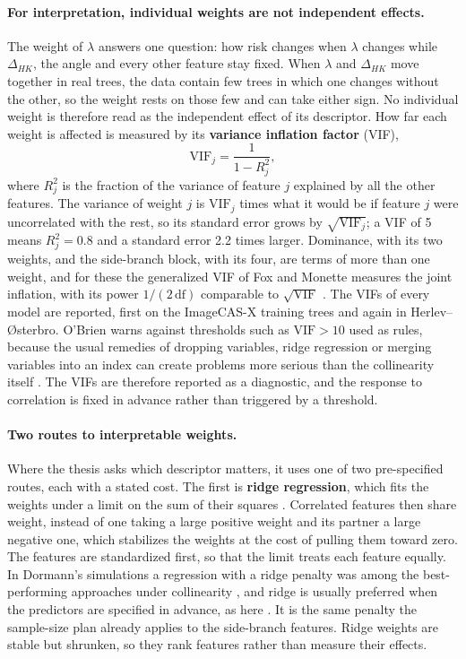 \paragraph{For interpretation, individual weights are not independent effects.}
The weight of $\lambda$ answers one question: how risk changes when $\lambda$ changes while $\Delta_{HK}$, the angle and every other feature stay fixed.
When $\lambda$ and $\Delta_{HK}$ move together in real trees, the data contain few trees in which one changes without the other, so the weight rests on those few and can take either sign.
No individual weight is therefore read as the independent effect of its descriptor.
How far each weight is affected is measured by its \textbf{variance inflation factor} (VIF),
\begin{equation}
  \mathrm{VIF}_j = \frac{1}{1 - R_j^2},
  \label{eq:risk-vif}
\end{equation}
where $R_j^2$ is the fraction of the variance of feature $j$ explained by all the other features.
The variance of weight $j$ is $\mathrm{VIF}_j$ times what it would be if feature $j$ were uncorrelated with the rest, so its standard error grows by $\sqrt{\mathrm{VIF}_j}$; a VIF of 5 means $R_j^2 = 0.8$ and a standard error 2.2 times larger.
Dominance, with its two weights, and the side-branch block, with its four, are terms of more than one weight, and for these the generalized VIF of Fox and Monette measures the joint inflation, with its power $1/(2\,\mathrm{df})$ comparable to $\sqrt{\mathrm{VIF}}$ \cite{fox1992gvif}.
The VIFs of every model are reported, first on the ImageCAS-X training trees and again in Herlev--{\O}sterbro.
O'Brien warns against thresholds such as $\mathrm{VIF} > 10$ used as rules, because the usual remedies of dropping variables, ridge regression or merging variables into an index can create problems more serious than the collinearity itself \cite{obrien2007vif}.
The VIFs are therefore reported as a diagnostic, and the response to correlation is fixed in advance rather than triggered by a threshold.

\paragraph{Two routes to interpretable weights.}
Where the thesis asks which descriptor matters, it uses one of two pre-specified routes, each with a stated cost.
The first is \textbf{ridge regression}, which fits the weights under a limit on the sum of their squares \cite{hoerl1970ridge,pavlou2015fewevents}.
Correlated features then share weight, instead of one taking a large positive weight and its partner a large negative one, which stabilizes the weights at the cost of pulling them toward zero.
The features are standardized first, so that the limit treats each feature equally.
In Dormann's simulations a regression with a ridge penalty was among the best-performing approaches under collinearity \cite{dormann2013collinearity}, and ridge is usually preferred when the predictors are specified in advance, as here \cite{pavlou2015fewevents}.
It is the same penalty the sample-size plan already applies to the side-branch features.
Ridge weights are stable but shrunken, so they rank features rather than measure their effects.

